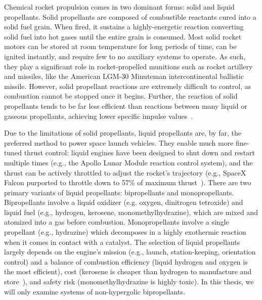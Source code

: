 Chemical rocket propulsion comes in two dominant forms: solid and liquid propellants. Solid propellants are composed of combustible reactants cured into a solid fuel grain. When fired, it sustains a highly-energetic reaction converting solid fuel into hot gases until the entire grain is consumed. Most solid rocket motors can be stored at room temperature for long periods of time, can be ignited instantly, and require few to no auxiliary systems to operate. As such, they play a significant role in rocket-propelled munitions such as rocket artillery and missiles, like the American LGM-30 Minuteman intercontinental ballistic missile. However, solid propellant reactions are extremely difficult to control, as combustion cannot be stopped once it begins. Further, the reaction of solid propellants tends to be far less efficient than reactions between many liquid or gaseous propellants, achieving lower specific impulse values~\cite{Sutton2003}.

Due to the limitations of solid propellants, liquid propellants are, by far, the preferred method to power space launch vehicles. They enable much more fine-tuned thrust control: liquid engines have been designed to shut down and restart multiple times (e.g., the Apollo Lunar Module reaction control system), and the thrust can be actively throttled to adjust the rocket's trajectory (e.g., SpaceX Falcon purported to throttle down to 57\% of maximum thrust~\cite{falconGuide}). There are two primary variants of liquid propellants: bipropellants and monopropellants. Bipropellants involve a liquid oxidizer (e.g. oxygen, dinitrogen tetroxide) and liquid fuel (e.g., hydrogen, kerosene, monomethylhydrazine), which are mixed and atomized into a gas before combustion. Monopropellants involve a single propellant (e.g., hydrazine) which decomposes in a highly exothermic reaction when it comes in contact with a catalyst. The selection of liquid propellants largely depends on the engine's mission (e.g., launch, station-keeping, orientation control) and a balance of combustion efficiency (liquid hydrogen and oxygen is the most efficient), cost (kerosene is cheaper than hydrogen to manufacture and store~\cite{propellantCosts}), and safety risk (monomethylhydrazine is highly toxic). In this thesis, we will only examine systems of non-hypergolic bipropellants.

